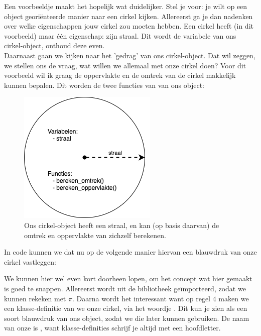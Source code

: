 Een voorbeeldje maakt het hopelijk wat duidelijker. Stel je voor: je wilt op een object georiënteerde manier naar een cirkel kijken. Allereerst ga je dan nadenken over welke eigenschappen jouw cirkel zou moeten hebben. Een cirkel heeft (in dit voorbeeld) maar één eigenschap: zijn straal. Dit wordt de variabele van ons cirkel-object, onthoud deze even. \\
\newpage
Daarnaast gaan we kijken naar het 'gedrag' van ons cirkel-object. Dat wil zeggen, we stellen ons de vraag, wat willen we allemaal met onze cirkel doen? Voor dit voorbeeld wil ik graag de oppervlakte en de omtrek van de cirkel makkelijk kunnen bepalen. Dit worden de twee functies van van ons object: 
\begin{figure}[h!]
\centering\includegraphics[scale=0.75]{Pictures/chapter07/cirkel.png}
\caption{Ons cirkel-object heeft een straal, en kan (op basis daarvan) de omtrek en oppervlakte van zichzelf berekenen.} 
\label{fig:cirkel} %
\end{figure}

In code kunnen we dat nu op de volgende manier hiervan een blauwdruk van onze cirkel vastleggen:


We kunnen hier wel even kort doorheen lopen, om het concept wat hier gemaakt is goed te snappen. Allereerst wordt uit de  bibliotheek  geïmporteerd, zodat we kunnen rekeken met $\pi$. Daarna wordt het interessant want op regel $4$ maken we een klasse-definitie van we onze cirkel, via het woordje . Dit kun je zien als een soort blauwdruk van ons object, zodat we die later kunnen gebruiken. De naam van onze  is , want klasse-definities schrijf je altijd met een hoofdletter. \\

